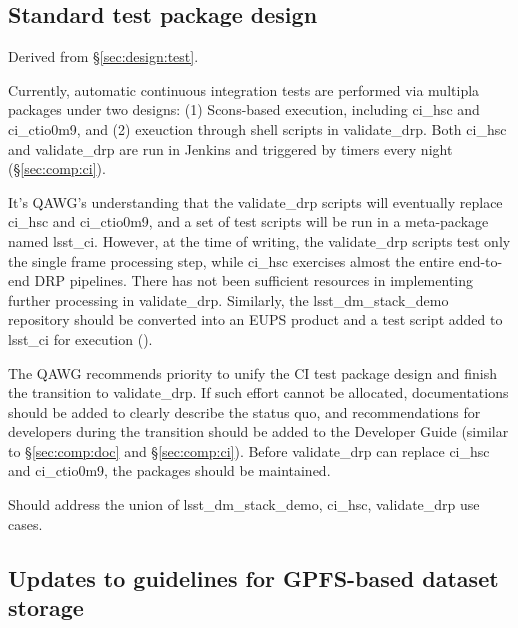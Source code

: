 \subsection{Standard test package design}

Derived from \S\ref{sec:design:test}.


Currently, automatic continuous integration tests are performed via
multipla packages under two designs: (1) Scons-based execution, including
ci\_hsc and ci\_ctio0m9, and (2) exeuction through shell scripts
in validate\_drp.  Both ci\_hsc and validate\_drp are run in
Jenkins and triggered by timers every night (\S\ref{sec:comp:ci}).

It's QAWG's understanding that the validate\_drp scripts will
eventually replace ci\_hsc and ci\_ctio0m9, and a set of test scripts
will be run in a meta-package named lsst\_ci.  However, at the time
of writing, the validate\_drp scripts test only the single frame
processing step, while ci\_hsc exercises almost the entire end-to-end
DRP pipelines.  There has not been sufficient resources in implementing
further processing in validate\_drp.  Similarly, the lsst\_dm\_stack\_demo
repository should be converted into an EUPS product and a test
script added to lsst\_ci for execution ().

The QAWG recommends priority to unify the CI test package design and
finish the transition to validate\_drp. If such effort cannot
be allocated, documentations should be added to clearly describe
the status quo, and recommendations for developers during the
transition should be added to the Developer Guide (similar to
\S\ref{sec:comp:doc} and \S\ref{sec:comp:ci}). Before validate\_drp
can replace ci\_hsc and ci\_ctio0m9, the packages should be maintained.


Should address the union of lsst\_dm\_stack\_demo, ci\_hsc, validate\_drp use
cases.

\subsection{Updates to guidelines for GPFS-based dataset storage}
\label{sec:comp:gpfs-dataset}
